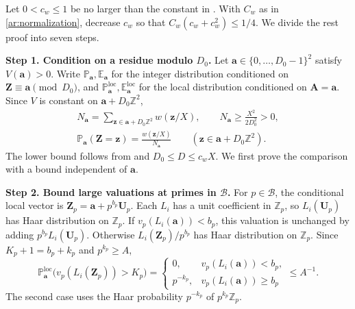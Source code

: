 \documentclass[twoside]{aomart}
\makeatletter
\theoremstyle{paperplain}
\theoremstyle{paperdefinition}
\renewenvironment{proof}[1][\proofname]{\par\pushQED{\qed}%
  \normalfont\topsep6\p@\@plus3\p@\relax\trivlist
  \item[\hskip\labelsep\itshape #1\@addpunct{.}]\ignorespaces
}{\popQED\endtrivlist\@endpefalse}
\newcommand{\E}{\mathbb E}
\newcommand{\Z}{\mathbb Z}
\newcommand{\Pp}{\mathbb P}
\numberwithin{equation}{section}
\makeatother
\begin{document}
\begin{proof}
Let $0<c_w\le1$ be no larger than the constant in
.
With $C_w$ as in \eqref{ar:normalization}, decrease $c_w$ so that
$C_w(c_w+c_w^2)\le1/4$. We divide the rest proof into seven steps.

\par
\medskip
\noindent\textbf{Step 1. Condition on a residue modulo $D_0$.}
Let $\mathbf a\in\{0,\ldots,D_0-1\}^2$ satisfy $V(\mathbf a)>0$.
Write $\Pp_{\mathbf a},\E_{\mathbf a}$ for the integer distribution
conditioned on $\mathbf Z\equiv\mathbf a\pmod{D_0}$, and
$\Pp^{\mathrm{loc}}_{\mathbf a},\E^{\mathrm{loc}}_{\mathbf a}$
for the local distribution conditioned on $\mathbf A=\mathbf a$.
Since $V$ is constant on $\mathbf a+D_0\Z^2$,
\begin{equation*}
 \begin{gathered}
 N_{\mathbf a}=\sum_{\mathbf z\in\mathbf a+D_0\Z^2}w(\mathbf z/X),
 \qquad N_{\mathbf a}\ge\frac{X^2}{2D_0^2}>0,\\
 \Pp_{\mathbf a}(\mathbf Z=\mathbf z)
 =\frac{w(\mathbf z/X)}{N_{\mathbf a}}
 \qquad(\mathbf z\in\mathbf a+D_0\Z^2).
 \end{gathered}
 \end{equation*}
The lower bound follows from  and $D_0\le D\le c_wX$.
We first prove the comparison with a bound independent of $\mathbf a$.

\par
\medskip
\noindent\textbf{Step 2. Bound large valuations at primes in $\mathcal B$.}
For $p\in\mathcal B$, the conditional local vector is
$\mathbf Z_p=\mathbf a+p^{b_p}\mathbf U_p$.
Each $L_i$ has a unit coefficient in $\Z_p$, so $L_i(\mathbf U_p)$
has Haar distribution on $\Z_p$.
If $v_p(L_i(\mathbf a))<b_p$, this valuation is unchanged by
adding $p^{b_p}L_i(\mathbf U_p)$.
Otherwise $L_i(\mathbf Z_p)/p^{b_p}$ has Haar distribution on $\Z_p$.
Since $K_p+1=b_p+k_p$ and $p^{k_p}\ge A$,
\begin{equation}
 \Pp^{\mathrm{loc}}_{\mathbf a}
    \bigl(v_p(L_i(\mathbf Z_p))>K_p\bigr)
 =\begin{cases}
 0,&v_p(L_i(\mathbf a))<b_p,\\
 p^{-k_p},&v_p(L_i(\mathbf a))\ge b_p
 \end{cases}
 \le A^{-1}.
 \label{ar:matching-local-tail}
\end{equation}
The second case uses the Haar probability $p^{-k_p}$ of $p^{k_p}\Z_p$.


\end{proof}
\end{document}
